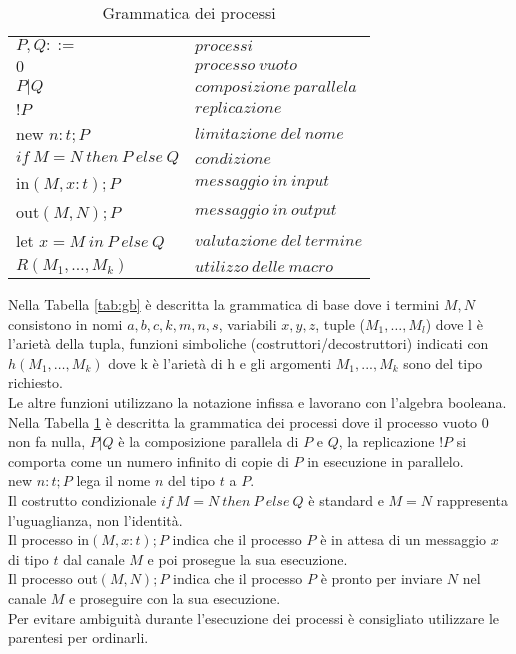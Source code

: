\begin{table}[h!]
    \begin{tabular}{ll}
        
        $P, Q::=$ & $processi$\\
        \quad$0$ & $processo \: vuoto$\\
        \quad$P|Q$ & $composizione \: parallela$\\
        \quad$!P$ & $replicazione$\\
        \quad new $n:t;P$ & $limitazione \: del \: nome$\\
        \quad$if \: M = N \: then \: P \: else \: Q$ & $condizione$\\
        \quad in$(M,x:t);P$ & $messaggio \: in \: input$\\
        \quad out$(M,N);P$ & $messaggio \: in \: output$\\
        \quad let $x=M \: in \: P \: else  \: Q$ & $valutazione \: del \: termine$\\
        \quad $R(M_1,\dots,M_k)$ & $utilizzo \: delle \: macro$\\       
    \end{tabular}
    \caption{Grammatica dei processi}
    \label{tab:gp}
\end{table}

\noindent Nella Tabella \ref{tab:gb} è descritta la grammatica di base dove i termini $M,N$ consistono in nomi $a, b, c, k, m, n, s$, variabili $x,y,z$, tuple ($M_1,\dots, M_l$) dove l è l'arietà della tupla, funzioni simboliche (costruttori/decostruttori) indicati con $h(M_1, \dots , M_k)$ dove k è l'arietà di h e gli argomenti $M_1,...,M_k$ sono del tipo richiesto.\\
Le altre funzioni utilizzano la notazione infissa e lavorano con l'algebra booleana.\\
Nella Tabella \ref{tab:gp} è descritta la grammatica dei processi dove il processo vuoto 0 non fa nulla, $P|Q$ è la composizione parallela di $P$ e $Q$, la replicazione $!P$ si comporta come un numero infinito di copie di $P$ in esecuzione in parallelo.\\ 
new $n:t;P$ lega il nome $n$ del tipo $t$ a $P$.\\
Il costrutto condizionale $if \: M = N \: then \: P \: else \: Q$ è standard e $M=N$ rappresenta l'uguaglianza, non l'identità.\\
Il processo in$(M,x:t);P$ indica che il processo $P$ è in attesa di un messaggio $x$ di tipo $t$ dal canale $M$ e poi prosegue la sua esecuzione.\\
Il processo out$(M,N);P$ indica che il processo $P$ è pronto per inviare $N$ nel canale $M$ e proseguire con la sua esecuzione.\\
Per evitare ambiguità durante l'esecuzione dei processi è consigliato utilizzare le parentesi per ordinarli.\\

